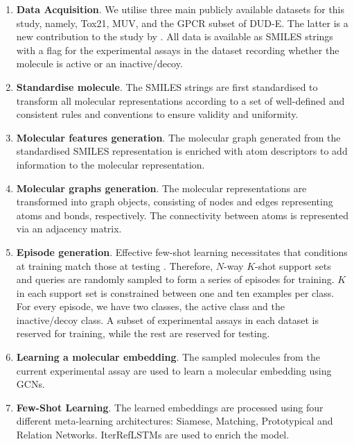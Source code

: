 \documentclass[journal=jcisd8,manuscript=article]{achemso} %
\begin{document}
\begin{enumerate}
    \item \textbf{Data Acquisition}. We utilise three main publicly available datasets for this study, namely, Tox21, MUV, and the GPCR subset of DUD-E. The latter is a new contribution to the study by \citet{altae2017low}. All data is available as SMILES strings with a flag for the experimental assays in the dataset recording whether the molecule is active or an inactive/decoy.

    \item \textbf{Standardise molecule}. The SMILES strings are first standardised to transform all molecular representations according to a set of well-defined and consistent rules and conventions to ensure validity and uniformity.

    \item \textbf{Molecular features generation}. The molecular graph generated from the standardised SMILES representation is enriched with atom descriptors to add information to the molecular representation.

    \item \textbf{Molecular graphs generation}. The molecular representations are transformed into graph objects, consisting of nodes and edges representing atoms and bonds, respectively. The connectivity between atoms is represented via an adjacency matrix.

    \item \textbf{Episode generation}. Effective few-shot learning necessitates that conditions at training match those at testing \citep{vinyals2016matching}. Therefore, $N$-way $K$-shot support sets and queries are randomly sampled to form a series of episodes for training. $K$ in each support set is constrained between one and ten examples per class. For every episode, we have two classes, the active class and the inactive/decoy class. A subset of experimental assays in each dataset is reserved for training, while the rest are reserved for testing.

    \item \textbf{Learning a molecular embedding}. The sampled molecules from the current experimental assay are used to learn a molecular embedding using GCNs.

    \item \textbf{Few-Shot Learning}. The learned embeddings are processed using four different meta-learning architectures: Siamese, Matching, Prototypical and Relation Networks. IterRefLSTMs \citep{altae2017low} are used to enrich the model.  


\end{enumerate}
\end{document}
